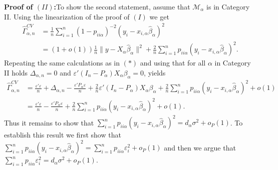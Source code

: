 \documentclass[Research_Module_ES.tex]{subfiles}
\begin{document}
\textbf{Proof of $(II)$:}To show the second statement, assume that $\mathcal{M}_\alpha$ is in Category II.
Using the linearization of the proof of $(I)$ we get
\begin{align*}
\hat{\Gamma}_{\alpha,n}^{CV} &= \frac{1}{n}\sum_{i=1}^n (1- p_{ii\alpha})^{-2}(y_i-x_{i,\alpha}\hat{\beta}_\alpha)^2\\
&= (1+o(1))\frac{1}{n}\lVert y-X_{\alpha}\hat{\beta}_\alpha\rVert^2 + \frac{2}{n}\sum_{i=1}^n p_{ii\alpha}(y_i-x_{i,\alpha}\hat{\beta}_\alpha)^2. 
\end{align*}
Repeating the same calculations as in $(\ast)$ and using that for all $\alpha$ in Category II holds $\Delta_{\alpha,n}=0$ and $\varepsilon'(I_n-P_\alpha)X_\alpha\beta_\alpha =0$, yields
\begin{align*}
\hat{\Gamma}_{\alpha,n}^{CV} &=\frac{\varepsilon'\varepsilon}{n} + \Delta_{\alpha,n} - \frac{\varepsilon'P_\alpha\varepsilon}{n} +\frac{2}{n}\varepsilon'(I_n-P_\alpha) X_\alpha\beta_\alpha+ \frac{2}{n}\sum_{i=1}^n p_{ii\alpha}(y_i-x_{i,\alpha}\hat{\beta}_\alpha)^2 +o(1)\\
&= \frac{\varepsilon'\varepsilon}{n}- \frac{\varepsilon'P_\alpha\varepsilon}{n} + \frac{2}{n}\sum_{i=1}^n p_{ii\alpha}(y_i-x_{i,\alpha}\hat{\beta}_\alpha)^2 +o(1).
\end{align*}
Thus it remains to show that $\sum_{i=1}^n p_{ii\alpha}(y_i-x_{i,\alpha}\hat{\beta}_\alpha)^2= d_\alpha \sigma^2 + o_P(1)$.
To establish this result we first show that $\sum_{i=1}^n p_{ii\alpha}(y_i-x_{i,\alpha}\hat{\beta}_\alpha)^2= \sum_{i=1}^n p_{ii\alpha}\varepsilon_i^2 + o_P(1)$ and then we argue that $\sum_{i=1}^n p_{ii\alpha}\varepsilon_i^2=d_\alpha\sigma^2+o_P(1)$.\\
\end{document}
